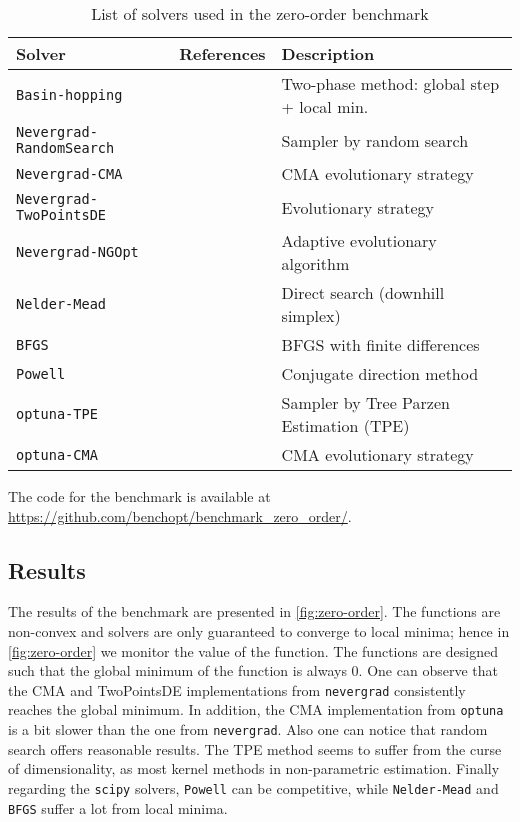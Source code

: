 \documentclass{article}
\newcommand{\repo}[1]{#1}
\newcommand{\rebuttal}[1]{#1}
\begin{document}
\begin{table}[h]
  \centering
  \small
  \caption{List of solvers used in the zero-order benchmark}
\begin{tabular}{l p{3.5cm} l}
\toprule
  \textbf{Solver} & \textbf{References} & \textbf{Description} \\
  \midrule
   \texttt{Basin-hopping} &\citet{wales1997global,2020SciPy-NMeth} &  Two-phase method:  global step + local min. \\
\texttt{Nevergrad-RandomSearch} & \citet{nevergrad,Bergstra_Bengio12} & Sampler by random search\\
\texttt{Nevergrad-CMA} & \citet{nevergrad,hansen2001completely} & CMA evolutionary strategy \\
\texttt{Nevergrad-TwoPointsDE} & \citet{nevergrad} & Evolutionary strategy \\
\texttt{Nevergrad-NGOpt} & \citet{nevergrad} & Adaptive evolutionary algorithm \\
\texttt{Nelder-Mead} & \citet{gao2012implementing,2020SciPy-NMeth} & Direct search (downhill simplex)\\
\texttt{BFGS} & \citet{2020SciPy-NMeth} & BFGS with finite differences\\
\texttt{Powell} & \citet{powell1964efficient,2020SciPy-NMeth} & Conjugate direction method\\
\texttt{optuna-TPE} & \citet{optuna,bergstra13} & Sampler by Tree Parzen Estimation (TPE)\\
\texttt{optuna-CMA} & \citet{optuna,hansen2001completely} & CMA evolutionary strategy \\
\bottomrule
\end{tabular}
\vskip -0.1in
\label{table:algo-zero-order-benchmark}
\end{table}


\rebuttal{\repo{The code for the benchmark is available at \url{https://github.com/benchopt/benchmark_zero_order/}.}}


\subsection{\rebuttal{Results}}
\rebuttal{The results of the benchmark are presented in \autoref{fig:zero-order}.
The functions are non-convex and solvers are only guaranteed to converge to local minima; hence in \autoref{fig:zero-order} we monitor the value of the function. The functions are designed such that the global minimum of the function is always 0. One can observe that the CMA and TwoPointsDE implementations from \texttt{nevergrad} consistently reaches the global minimum.
In addition, the CMA implementation from \texttt{optuna} is a bit slower than the one from \texttt{nevergrad}. Also one can notice that random search offers reasonable results.
The TPE method seems to suffer from the curse of dimensionality, as most kernel methods in non-parametric estimation. Finally regarding the \texttt{scipy} solvers, \texttt{Powell} can be competitive, while \texttt{Nelder-Mead} and \texttt{BFGS} suffer a lot from local minima.}
\end{document}
